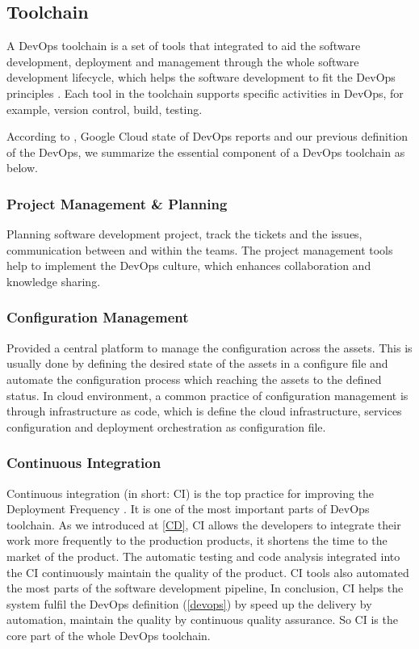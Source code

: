 \subsection{Toolchain}
A DevOps toolchain is a set of tools that integrated to aid the software development, deployment and management through the whole software development lifecycle, which helps the software development to fit the DevOps principles \cite{DevOpsto7:online}\cite{Toolchai10:online}\cite{WhatisaD20:online}. Each tool in the toolchain supports specific activities in DevOps, for example, version control, build, testing.
\par
According to \cite{WhatisaD20:online}, Google Cloud state of DevOps reports \cite{forsgrenaccelerate}\cite{velasquez2014state}\cite{forsgren20192019} and our previous definition of the DevOps, we summarize the essential component of a DevOps toolchain as below.
\subsubsection{Project Management \& Planning}
Planning software development project, track the tickets and the issues, communication between and within the teams. The project management tools help to implement the DevOps culture, which enhances collaboration and knowledge sharing.
\subsubsection{Configuration Management}
Provided a central platform to manage the configuration across the assets. This is usually done by defining the desired state of the assets in a configure file and automate the configuration process which reaching the assets to the defined status. In cloud environment, a common practice of configuration management is through infrastructure as code, which is define the cloud infrastructure, services configuration and deployment orchestration as configuration file\cite{7965401}.
\subsubsection{Continuous Integration}
Continuous integration (in short: CI) is the top practice for improving the Deployment Frequency \cite{velasquez2014state}. It is one of the most important parts of DevOps toolchain. As we introduced at \ref{CD}, CI allows the developers to integrate their work more frequently to the production products, it shortens the time to the market of the product. The automatic testing and code analysis integrated into the CI continuously maintain the quality of the product. CI tools also automated the most parts of the software development pipeline, In conclusion, CI helps the system fulfil the DevOps definition (\ref{devops}) by speed up the delivery by automation, maintain the quality by continuous quality assurance. So CI is the core part of the whole DevOps toolchain.
